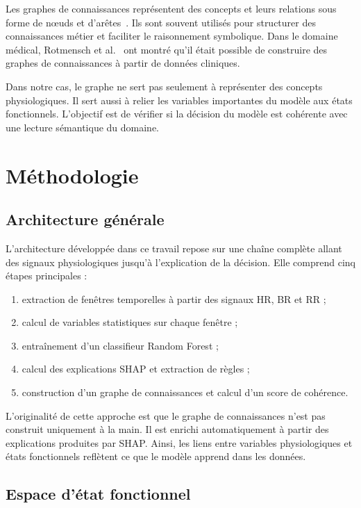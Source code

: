 \documentclass[12pt,a4paper]{article}
\begin{document}
Les graphes de connaissances représentent des concepts et leurs relations
sous forme de nœuds et d'arêtes~\cite{hogan2021}. Ils sont souvent utilisés
pour structurer des connaissances métier et faciliter le raisonnement
symbolique. Dans le domaine médical, Rotmensch et al.~\cite{rotmensch2017}
ont montré qu'il était possible de construire des graphes de connaissances à
partir de données cliniques.

Dans notre cas, le graphe ne sert pas seulement à représenter des concepts
physiologiques. Il sert aussi à relier les variables importantes du modèle
aux états fonctionnels. L'objectif est de vérifier si la décision du modèle
est cohérente avec une lecture sémantique du domaine.


\section{Méthodologie}
\label{sec:methodo}


\subsection{Architecture générale}

L'architecture développée dans ce travail repose sur une chaîne complète
allant des signaux physiologiques jusqu'à l'explication de la décision. Elle
comprend cinq étapes principales :

\begin{enumerate}[leftmargin=1.5em]
  \item extraction de fenêtres temporelles à partir des signaux HR, BR et RR ;
  \item calcul de variables statistiques sur chaque fenêtre ;
  \item entraînement d'un classifieur Random Forest ;
  \item calcul des explications SHAP et extraction de règles ;
  \item construction d'un graphe de connaissances et calcul d'un score de
        cohérence.
\end{enumerate}

L'originalité de cette approche est que le graphe de connaissances n'est pas
construit uniquement à la main. Il est enrichi automatiquement à partir des
explications produites par SHAP. Ainsi, les liens entre variables
physiologiques et états fonctionnels reflètent ce que le modèle apprend dans
les données.

\subsection{Espace d'état fonctionnel}
\end{document}

